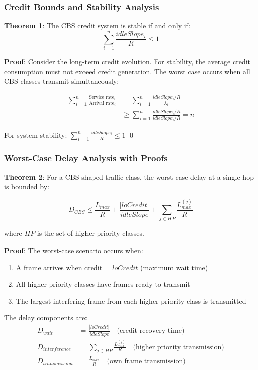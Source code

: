 \documentclass[10pt, journal, compsoc]{IEEEtran}
\begin{document}
\subsubsection{Credit Bounds and Stability Analysis}

\textbf{Theorem 1}: The CBS credit system is stable if and only if:
\begin{equation}
\sum_{i=1}^{n} \frac{idleSlope_i}{R} \leq 1
\end{equation}

\textbf{Proof}: Consider the long-term credit evolution. For stability, the average credit consumption must not exceed credit generation. The worst case occurs when all CBS classes transmit simultaneously:

\begin{align}
\sum_{i=1}^{n} \frac{\text{Service rate}_i}{\text{Arrival rate}_i} &= \sum_{i=1}^{n} \frac{idleSlope_i/R}{\lambda_i} \\
&\geq \sum_{i=1}^{n} \frac{idleSlope_i/R}{idleSlope_i/R} = n
\end{align}

For system stability: $\sum_{i=1}^{n} \frac{idleSlope_i}{R} \leq 1$ \qed

\subsubsection{Worst-Case Delay Analysis with Proofs}

\textbf{Theorem 2}: For a CBS-shaped traffic class, the worst-case delay at a single hop is bounded by:

\begin{equation}
D_{CBS} \leq \frac{L_{max}}{R} + \frac{|loCredit|}{idleSlope} + \sum_{j \in HP} \frac{L_{max}^{(j)}}{R}
\end{equation}

where $HP$ is the set of higher-priority classes.

\textbf{Proof}: The worst-case scenario occurs when:
\begin{enumerate}
    \item A frame arrives when credit = $loCredit$ (maximum wait time)
    \item All higher-priority classes have frames ready to transmit
    \item The largest interfering frame from each higher-priority class is transmitted
\end{enumerate}

The delay components are:
\begin{align}
D_{wait} &= \frac{|loCredit|}{idleSlope} \quad \text{(credit recovery time)} \\
D_{interference} &= \sum_{j \in HP} \frac{L_{max}^{(j)}}{R} \quad \text{(higher priority transmission)} \\
D_{transmission} &= \frac{L_{max}}{R} \quad \text{(own frame transmission)}
\end{align}
\end{document}
